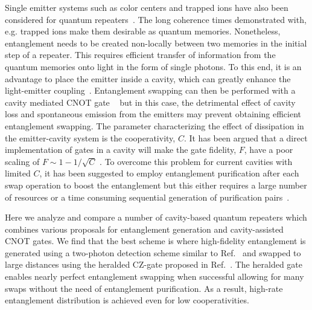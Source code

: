 Single emitter systems such as color centers and trapped ions have also been
considered for quantum repeaters~\cite{childress,sangouard2}. The long coherence
times demonstrated with, e.g. trapped ions make them desirable as quantum
memories. Nonetheless, entanglement needs to be created non-locally between two
memories in the initial step of a repeater. This requires efficient transfer of
information from the quantum memories onto light in the form of single photons.
To this end, it is an advantage to place the emitter inside a cavity, which can
greatly enhance the light-emitter coupling~\cite{acin,ritter}. Entanglement
swapping can then be performed with a cavity mediated CNOT gate
~\cite{zoller1,haroche1} but in this case, the detrimental effect of cavity loss
and spontaneous emission from the emitters may prevent obtaining efficient
entanglement swapping. The parameter characterizing the effect of dissipation in
the emitter-cavity system is the cooperativity, $C$. It has been argued that a
direct implementation of gates in a cavity will make the gate fidelity, $F$,
have a poor scaling of $F\sim1-1/\sqrt{C}$ \cite{kastoryano,Anders2prl}. To
overcome this problem for current cavities with limited $C$, it has been
suggested to employ entanglement purification after each swap operation to boost
the entanglement but this either requires a large number of resources or a time
consuming sequential generation of purification
pairs~\cite{bennett,deutsch,duan4,pan}.

Here we analyze and compare a number of cavity-based quantum repeaters which
combines various proposals for entanglement generation and cavity-assisted CNOT
gates. We find that the best scheme is where high-fidelity entanglement is
generated using a two-photon detection scheme similar to Ref.~\cite{kimble2} and
swapped to large distances using the heralded CZ-gate proposed in
Ref.~\cite{johannes}. The heralded gate enables nearly perfect entanglement
swapping when successful allowing for many swaps without the need of
entanglement purification. As a result, high-rate entanglement distribution is
achieved even for low cooperativities.

